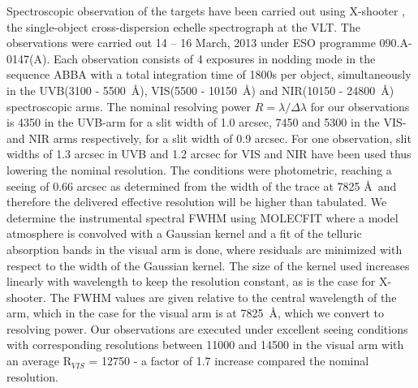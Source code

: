 \documentclass{aa}    %
\begin{document}
Spectroscopic observation of the targets have been carried out using X-shooter
\citep{Vernet2011}, the single-object cross-dispersion echelle spectrograph at
the VLT. The observations were carried out 14 -- 16 March, 2013 under ESO
programme 090.A-0147(A). Each observation consists of 4 exposures in nodding mode in
the sequence ABBA with a total integration time of 1800s per object,
simultaneously in the UVB(3100 - 5500~\AA), VIS(5500 - 10150~\AA)  and NIR(10150
- 24800~\AA) spectroscopic arms. The nominal resolving power $R = \lambda /
\Delta \lambda$ for our observations is 4350 in the UVB-arm for a slit width of
1.0 arcsec, 7450 and 5300 in the VIS- and NIR arms respectively, for a slit
width of 0.9 arcsec. For one observation, slit widths of 1.3 arcsec in UVB and
1.2 arcsec for VIS and NIR have been used thus lowering the nominal resolution.
The conditions were photometric, reaching a seeing of 0.66 arcsec as determined
from the width of the trace at 7825 \AA~and therefore the delivered effective
resolution will be higher than tabulated. We determine the instrumental spectral
FWHM using MOLECFIT \citep{Smette2015, Kausch2015} where a model atmosphere is
convolved with a Gaussian kernel and a fit of the telluric absorption bands in
the visual arm is done, where residuals are minimized with respect to the
width of the Gaussian kernel. The size of the kernel used increases linearly
with wavelength to keep the resolution constant, as is the case for X-shooter.
The FWHM values are given relative to the central wavelength of the arm, which
in the case for the visual arm is at 7825~\AA, which we convert to resolving
power.
Our observations are executed under excellent seeing conditions with
corresponding resolutions between 11000 and 14500 in the visual arm with an
average R$_{VIS}$ = 12750 - a factor of 1.7 increase compared the nominal
resolution. 
\end{document}
